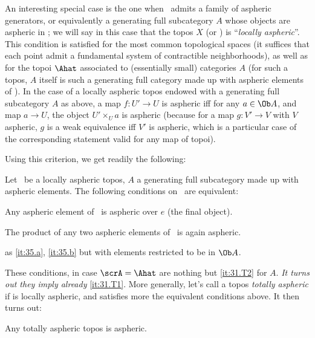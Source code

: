 An interesting special case is the one when \scrA\ admits a family of
aspheric generators, or equivalently a generating full subcategory $A$
whose objects are aspheric in \scrA; we will say in this case that the
topos $X$ (or \scrA) is ``\emph{locally aspheric}''. This condition is
satisfied for the most common topological spaces (it suffices that
each point admit a fundamental system of contractible neighborhoods),
as well as for the topoi $\Ahat$ associated to (essentially
small) categories $A$ (for such a topos, $A$ itself is such a
generating full category made up with aspheric elements of \scrA). In
the case of a locally aspheric topos endowed with a generating full
subcategory $A$ as above, a map $f:U'\to U$ is aspheric if{f} for any
$a\in\Ob A$, and map $a \to U$, the object $U' \times_U a$ is aspheric
(because for a map $g: V'\to V$ with $V$ aspheric, $g$ is a weak
equivalence if{f} $V'$ is aspheric, which is a particular case of the
corresponding statement valid for any map of topoi).

Using this criterion, we get readily the following:

\begin{propositionnum}\label{prop:35.1}
  Let \scrA\ be a locally aspheric topos, $A$ a generating full
  subcategory made up with aspheric elements. The following conditions
  on \scrA\ are equivalent:
  \begin{description}[leftmargin=2em]
  \item[\namedlabel{it:35.a}{a)}]
    Any aspheric element of \scrA\ is aspheric over $e$ (the final
    object).
  \item[\namedlabel{it:35.b}{b)}]
    The product of any two aspheric elements of \scrA\ is again
    aspheric.
  \item[\namedlabel{it:35.aprime}{a')}, \namedlabel{it:35.bprime}{b')}]
    as {\normalfont\ref{it:35.a}}, {\normalfont\ref{it:35.b}} but with elements restricted to be
    in $\Ob A$.
  \end{description}
\end{propositionnum}

These conditions, in case $\scrA = \Ahat$ are nothing but
\ref{it:31.T2} for $A$. \emph{It turns out they imply already}
\ref{it:31.T1}. More generally, let's call a topos
\emph{totally aspheric} if is locally aspheric, and satisfies more the
equivalent conditions above. It then turns out:
\begin{corollary}
  Any totally aspheric topos is aspheric.
\end{corollary}


